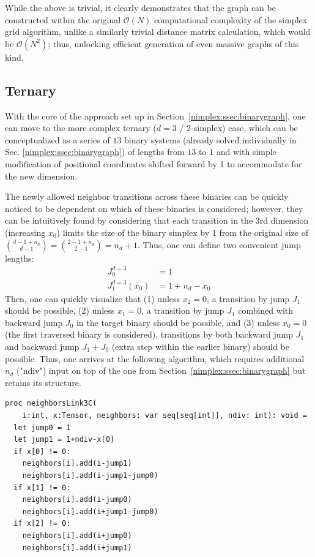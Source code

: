 While the above is trivial, it clearly demonstrates that the graph can be constructed within the original $\mathcal{O}(N)$ computational complexity of the simplex grid algorithm, unlike a similarly trivial distance matrix calculation, which would be $\mathcal{O}(N^2)$; thus, unlocking efficient generation of even massive graphs of this kind.

\subsection{Ternary} \label{nimplex:ssec:ternarygraph}

With the core of the approach set up in Section~\ref{nimplex:ssec:binarygraph}, one can move to the more complex ternary ($d=3$  / 2-simplex) case, which can be conceptualized as a series of $13$ binary systems (already solved individually in Sec. \ref{nimplex:ssec:binarygraph}) of lengths from $13$ to $1$ and with simple modification of positional coordinates shifted forward by 1 to accommodate for the new dimension. 

The newly allowed neighbor transitions across these binaries can be quickly noticed to be dependent on which of these binaries is considered; however, they can be intuitively found by considering that each transition in the 3rd dimension (increasing $x_0$) limits the size of the binary simplex by 1 from the original size of $\binom{d-1+n_d}{d-1} = \binom{2-1+n_d}{2-1} = n_d+1$. Thus, one can define two convenient jump lengths:
\[
\begin{aligned}
    J_0^{d=3} &= 1\\
    J_1^{d=3}(x_0) &= 1 + n_d - x_0
\end{aligned}
\]
Then, one can quickly visualize that (1) unless $x_2=0$, a transition by jump $J_1$ should be possible, (2) unless $x_1=0$, a transition by jump $J_1$ combined with backward jump $J_0$ in the target binary should be possible, and (3) unless $x_0=0$ (the first traversed binary is considered), transitions by both backward jump $J_1$ and backward jump $J_1+J_0$ (extra step within the earlier binary) should be possible. Thus, one arrives at the following algorithm, which requires additional $n_d$ ("ndiv") input on top of the one from Section~\ref{nimplex:ssec:binarygraph} but retains its structure.

\begin{verbatim}
proc neighborsLink3C(
    i:int, x:Tensor, neighbors: var seq[seq[int]], ndiv: int): void =
  let jump0 = 1
  let jump1 = 1+ndiv-x[0]
  if x[0] != 0:
    neighbors[i].add(i-jump1)
    neighbors[i].add(i-jump1-jump0)
  if x[1] != 0:
    neighbors[i].add(i-jump0)
    neighbors[i].add(i+jump1-jump0)
  if x[2] != 0:
    neighbors[i].add(i+jump0)
    neighbors[i].add(i+jump1)
\end{verbatim}

